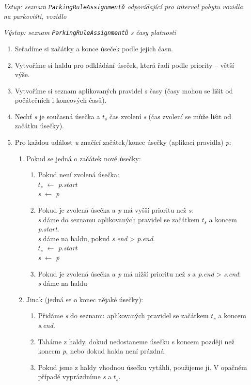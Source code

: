 \textit{Vstup: seznam \texttt{ParkingRuleAssignmentů} odpovídající pro interval pobytu vozidla na parkovišti, vozidlo}

\textit{Výstup: seznam \texttt{ParkingRuleAssignmentů} s časy platnosti}
\begin{enumerate}
  \item Seřadíme si začátky a konce úseček podle jejich času.
  \item Vytvoříme si haldu pro odkládání úseček, která řadí podle priority -- větší výše.
  \item Vytvoříme si seznam aplikovaných pravidel s časy (časy mohou se lišit od počátečních i koncových časů).
  \item Nechť \textit{s} je současná úsečka a \textit{$t_s$} čas zvolení \textit{s} (čas zvolení se může lišit od začátku úsečky).
  \item Pro každou událost \textit{u} značící začátek/konec úsečky (aplikaci pravidla) \textit{p}:
  \begin{enumerate}
    \item Pokud se jedná o začátek nové úsečky:
    \begin{enumerate}
      \item Pokud není zvolená úsečka:\\
            \textit{$t_s$} $\leftarrow$ \textit{p.start}\\
            \textit{s} $\leftarrow$ \textit{p}
      \item Pokud je zvolená úsečka a \textit{p} má vyšší prioritu než \textit{s}:\\
            \textit{s} dáme do seznamu aplikovaných pravidel se začátkem \textit{$t_s$} a koncem \textit{p.start}.\\
            \textit{s} dáme na haldu, pokud \textit{s.end} > \textit{p.end}.\\
            \textit{$t_s$} $\leftarrow$ \textit{p.start}\\
            \textit{s} $\leftarrow$ \textit{p}
      \item Pokud je zvolená úsečka a \textit{p} má nižší prioritu než \textit{s} a \textit{p.end} > \textit{s.end}:\\
            \textit{s} dáme na haldu
    \end{enumerate}
    \item Jinak (jedná se o konec nějaké úsečky):
    \begin{enumerate}
      \item Přidáme \textit{s} do seznamu aplikovaných pravidel se začátkem \textit{$t_s$} a koncem \textit{s.end}.
      \item Taháme z haldy, dokud nedostaneme úsečku s koncem později než konecm \textit{p}, nebo dokud halda není prázdná.
      \item Pokud jsme z haldy vhodnou úsečku vytáhli, použijeme ji. V opačném případě vyprázdníme \textit{s} a \textit{$t_s$}.
    \end{enumerate}
  \end{enumerate}
\end{enumerate}


